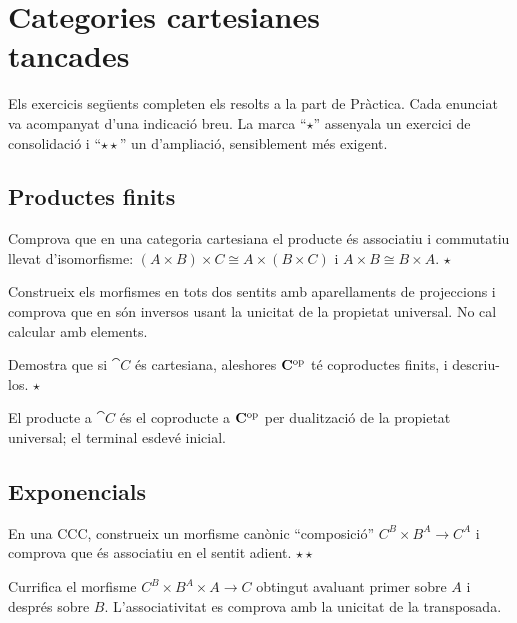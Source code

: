 \chapter[Cartesianes tancades]{\texorpdfstring{Categories cartesianes\\ tancades}{Categories cartesianes tancades}}

Els exercicis següents completen els resolts a la part de Pràctica. Cada enunciat va acompanyat d'una indicació breu. La marca \enquote{$\star$} assenyala un exercici de consolidació i \enquote{$\star\star$} un d'ampliació, sensiblement més exigent.

\section{Productes finits}

\begin{exercici}
Comprova que en una categoria cartesiana el producte és associatiu i commutatiu llevat d'isomorfisme: $(A\times B)\times C\cong A\times(B\times C)$ i $A\times B\cong B\times A$. \hfill{\normalfont$\star$}
\begin{indicacio}
Construeix els morfismes en tots dos sentits amb aparellaments de projeccions i comprova que en són inversos usant la unicitat de la propietat universal. No cal calcular amb elements.
\end{indicacio}
\end{exercici}

\begin{exercici}
Demostra que si $\cat{C}$ és cartesiana, aleshores $\mathbf{C}^{\mathrm{op}}$ té coproductes finits, i descriu-los. \hfill{\normalfont$\star$}
\begin{indicacio}
El producte a $\cat{C}$ és el coproducte a $\mathbf{C}^{\mathrm{op}}$ per dualització de la propietat universal; el terminal esdevé inicial.
\end{indicacio}
\end{exercici}

\section{Exponencials}

\begin{exercici}
En una CCC, construeix un morfisme canònic \enquote{composició} $C^{B}\times B^{A}\to C^{A}$ i comprova que és associatiu en el sentit adient. \hfill{\normalfont$\star\star$}
\begin{indicacio}
Currifica el morfisme $C^{B}\times B^{A}\times A\to C$ obtingut avaluant primer sobre $A$ i després sobre $B$. L'associativitat es comprova amb la unicitat de la transposada.
\end{indicacio}
\end{exercici}

